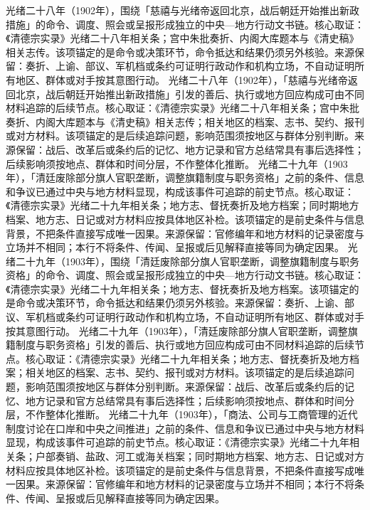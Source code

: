 光绪二十八年（1902年），围绕「慈禧与光绪帝返回北京，战后朝廷开始推出新政措施」的命令、调度、照会或呈报形成独立的中央—地方行动文书链。核心取证：《清德宗实录》光绪二十八年相关条；宫中朱批奏折、内阁大库题本与《清史稿》相关志传。该项锚定的是命令或决策环节，命令抵达和结果仍须另外核验。来源保留：奏折、上谕、部议、军机档或条约可证明行政动作和机构立场，不自动证明所有地区、群体或对手按其意图行动。
光绪二十八年（1902年），「慈禧与光绪帝返回北京，战后朝廷开始推出新政措施」引发的善后、执行或地方回应构成可由不同材料追踪的后续节点。核心取证：《清德宗实录》光绪二十八年相关条；宫中朱批奏折、内阁大库题本与《清史稿》相关志传；相关地区的档案、志书、契约、报刊或对方材料。该项锚定的是后续追踪问题，影响范围须按地区与群体分别判断。来源保留：战后、改革后或条约后的记忆、地方记录和官方总结常具有事后选择性；后续影响须按地点、群体和时间分层，不作整体化推断。
光绪二十九年（1903年），「清廷废除部分旗人官职垄断，调整旗籍制度与职务资格」之前的条件、信息和争议已通过中央与地方材料显现，构成该事件可追踪的前史节点。核心取证：《清德宗实录》光绪二十九年相关条；地方志、督抚奏折及地方档案；同时期地方档案、地方志、日记或对方材料应按具体地区补检。该项锚定的是前史条件与信息背景，不把条件直接写成唯一因果。来源保留：官修编年和地方材料的记录密度与立场并不相同；本行不将条件、传闻、呈报或后见解释直接等同为确定因果。
光绪二十九年（1903年），围绕「清廷废除部分旗人官职垄断，调整旗籍制度与职务资格」的命令、调度、照会或呈报形成独立的中央—地方行动文书链。核心取证：《清德宗实录》光绪二十九年相关条；地方志、督抚奏折及地方档案。该项锚定的是命令或决策环节，命令抵达和结果仍须另外核验。来源保留：奏折、上谕、部议、军机档或条约可证明行政动作和机构立场，不自动证明所有地区、群体或对手按其意图行动。
光绪二十九年（1903年），「清廷废除部分旗人官职垄断，调整旗籍制度与职务资格」引发的善后、执行或地方回应构成可由不同材料追踪的后续节点。核心取证：《清德宗实录》光绪二十九年相关条；地方志、督抚奏折及地方档案；相关地区的档案、志书、契约、报刊或对方材料。该项锚定的是后续追踪问题，影响范围须按地区与群体分别判断。来源保留：战后、改革后或条约后的记忆、地方记录和官方总结常具有事后选择性；后续影响须按地点、群体和时间分层，不作整体化推断。
光绪二十九年（1903年），「商法、公司与工商管理的近代制度讨论在口岸和中央之间推进」之前的条件、信息和争议已通过中央与地方材料显现，构成该事件可追踪的前史节点。核心取证：《清德宗实录》光绪二十九年相关条；户部奏销、盐政、河工或海关档案；同时期地方档案、地方志、日记或对方材料应按具体地区补检。该项锚定的是前史条件与信息背景，不把条件直接写成唯一因果。来源保留：官修编年和地方材料的记录密度与立场并不相同；本行不将条件、传闻、呈报或后见解释直接等同为确定因果。
